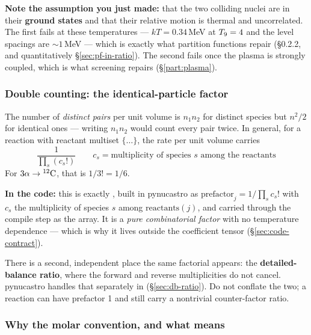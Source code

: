 \begin{aside}
\textbf{Note the assumption you just made:} that the two colliding nuclei are in
their \textbf{ground states} and that their relative motion is thermal and
uncorrelated. The first fails at these temperatures --- $kT = 0.34$\,MeV at
$\Tn = 4$ and the level spacings are ${\sim}1$\,MeV --- which is exactly what
partition functions repair (\S0.2.2, and quantitatively
\S\ref{sec:pf-in-ratio}). The second fails once the plasma is strongly coupled,
which is what screening repairs (\S\ref{part:plasma}).
\end{aside}

\subsubsection{Double counting: the identical-particle factor}
\label{sec:double-counting}

The number of \emph{distinct pairs} per unit volume is $n_1n_2$ for distinct
species but $n^2/2$ for identical ones \citep[eq.~2]{adelberger2011} --- writing
$n_1n_2$ would count every pair twice. In general, for a reaction with reactant
multiset $\{\dots\}$, the rate per unit volume carries
%
\begin{equation*}
\frac{1}{\prod_s (c_s!)}
\qquad c_s = \text{multiplicity of species } s \text{ among the reactants}
\end{equation*}
%
For $3\alpha \to \nuc{C}{12}$, that is $1/3! = 1/6$.

\begin{repopointer}
\textbf{In the code:} this is exactly , built in
pynucastro as $\text{prefactor}_j = 1/\prod_s c_s!$ with $c_s$ the multiplicity
of species $s$ among $\text{reactants}(j)$, and carried through the compile step
as the  array. It is a \emph{pure combinatorial factor} with no
temperature dependence --- which is why it lives outside the coefficient tensor
(\S\ref{sec:code-contract}).
\end{repopointer}

There is a second, independent place the same factorial appears: the
\textbf{detailed-balance ratio}, where the forward and reverse multiplicities do
not cancel. pynucastro handles that separately in
 (\S\ref{sec:db-ratio}). Do not conflate the
two; a reaction can have prefactor 1 and still carry a nontrivial
counter-factor ratio.

\subsubsection{Why the molar convention, and what \texorpdfstring{\Nasigv}{NA<sigma v>} means}
\label{sec:molar}

